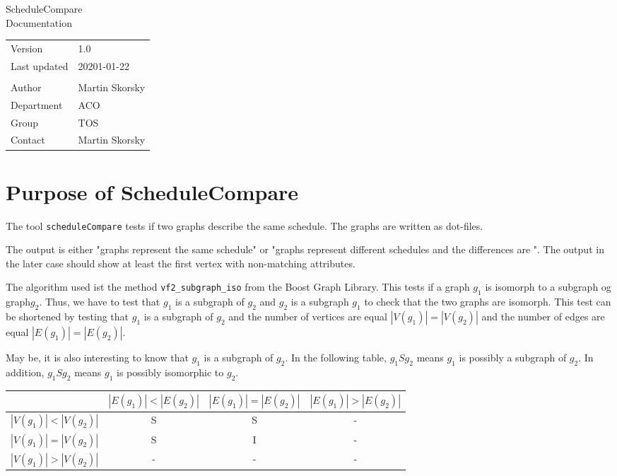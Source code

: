 \documentclass[12pt,a4paper]{report}
\begin{document}
\begin{titlepage}
\begin{center}
\vspace{2em}
\Huge{ScheduleCompare}\\[2cm]
\Large{Documentation}\\[2cm]
\begin{large}
\begin{tabularx}{\textwidth}{Xl}
Version & 1.0\\
Last updated & 20201-01-22\\
\vspace{1.5cm}\\
Author & Martin Skorsky\\
Department & ACO \\
Group & TOS\\
Contact & Martin Skorsky
\end{tabularx}%
\end{large}

\vfill

\end{center}
\end{titlepage}
\tableofcontents
\chapter{Purpose of ScheduleCompare}
The tool \texttt{scheduleCompare} tests if two graphs describe the same schedule. The graphs are written as dot-files.

The output is either "graphs represent the same schedule" or "graphs represent different schedules and the differences are \textellipsis".
The output in the later case should show at least the first vertex with non-matching attributes.

The algorithm used ist the method \texttt{vf2\_subgraph\_iso} from the Boost Graph Library. This tests if a graph $g_1$ is isomorph 
to a subgraph og graph$g_2$. Thus, we have to test that $g_1$ is a subgraph of $g_2$ and $g_2$ is a subgraph $g_1$ to check 
that the two graphs are isomorph. This test can be shortened by testing that $g_1$ is a subgraph of $g_2$ and the number 
of vertices are equal $|V(g_1)| = |V(g_2)|$ and the number of edges are equal $|E(g_1)| = |E(g_2)|$.

May be, it is also interesting to know that $g_1$ is a subgraph of $g_2$. In the following table, $g_1 S g_2$ 
means $g_1$ is possibly a subgraph of $g_2$. In addition, $g_1 S g_2$ means $g_1$ is possibly isomorphic to $g_2$. 
\begin{table}
\label{tab:cardinalities}
\begin{tabular}[t]{|c|ccc|}
\hline
                     & $|E(g_1)|<|E(g_2)|$ & $|E(g_1)|=|E(g_2)|$ & $|E(g_1)|>|E(g_2)|$ \\ \hline
 $|V(g_1)|<|V(g_2)|$ &          S          &          S          &          -  \\
 $|V(g_1)|=|V(g_2)|$ &          S          &          I          &          -  \\
 $|V(g_1)|>|V(g_2)|$ &          -          &          -          &          -  \\ \hline
\end{tabular}
\end{table}
\end{document}
